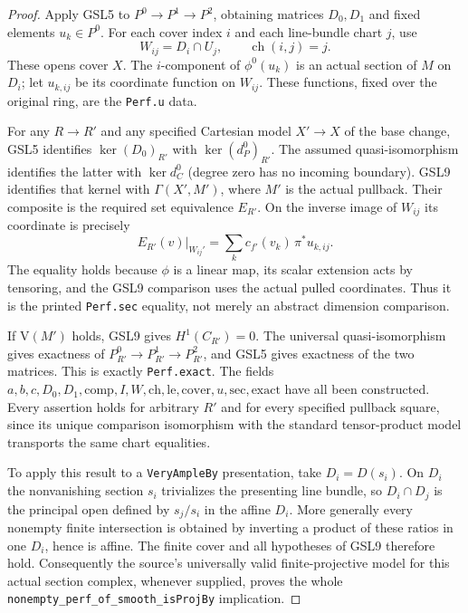 \begin{proof}
Apply GSL5 to $P^0\to P^1\to P^2$, obtaining matrices
$D_0,D_1$ and fixed elements $u_k\in P^0$.  For each cover index
$i$ and each line-bundle chart $j$, use
\[
 W_{ij}=D_i\cap U_j,\qquad \operatorname{ch}(i,j)=j.
\]
These opens cover $X$.  The $i$-component of $\phi^0(u_k)$ is
an actual section of $M$ on $D_i$; let $u_{k,ij}$ be its coordinate
function on $W_{ij}$.  These functions, fixed over the original
ring, are the \texttt{Perf.u} data.

For any $R\to R'$ and any specified Cartesian model
$X'\to X$ of the base change, GSL5 identifies
$\ker(D_0)_{R'}$ with $\ker(d_P^0)_{R'}$.  The assumed
quasi-isomorphism identifies the latter with $\ker d_C^0$
(degree zero has no incoming boundary).  GSL9 identifies that kernel
with $\Gamma(X',M')$, where $M'$ is the actual pullback.  Their
composite is the required set equivalence $E_{R'}$.  On the inverse
image of $W_{ij}$ its coordinate is precisely
\[
 E_{R'}(v)|_{W_{ij}'}
   =\sum_k c_{f'}(v_k)\,\pi^*u_{k,ij}. \tag{GSL.6}
\]
The equality holds because $\phi$ is a linear map, its scalar
extension acts by tensoring, and the GSL9 comparison uses the
actual pulled coordinates.  Thus it is the printed
\texttt{Perf.sec} equality, not merely an abstract dimension
comparison.

If $\mathrm V(M')$ holds, GSL9 gives $H^1(C_{R'})=0$.
The universal quasi-isomorphism gives exactness of
$P^0_{R'}\to P^1_{R'}\to P^2_{R'}$, and GSL5 gives exactness
of the two matrices.  This is exactly \texttt{Perf.exact}.
The fields $a,b,c,D_0,D_1,\mathrm{comp},I,W,\mathrm{ch},
\mathrm{le},\mathrm{cover},u,\mathrm{sec},\mathrm{exact}$ have
all been constructed.  Every assertion holds for arbitrary $R'$ and
for every specified pullback square, since its unique comparison
isomorphism with the standard tensor-product model transports the
same chart equalities.

To apply this result to a \texttt{VeryAmpleBy} presentation,
take $D_i=D(s_i)$.  On $D_i$ the nonvanishing section $s_i$
trivializes the presenting line bundle, so
$D_i\cap D_j$ is the principal open defined by $s_j/s_i$ in
the affine $D_i$.  More generally every nonempty finite
intersection is obtained by inverting a product of these
ratios in one $D_i$, hence is affine.  The finite cover and
all hypotheses of GSL9 therefore hold.  Consequently the
source's universally valid finite-projective model for this
actual section complex, whenever supplied, proves the whole
\texttt{nonempty\_perf\_of\_smooth\_isProjBy} implication.
\end{proof}

